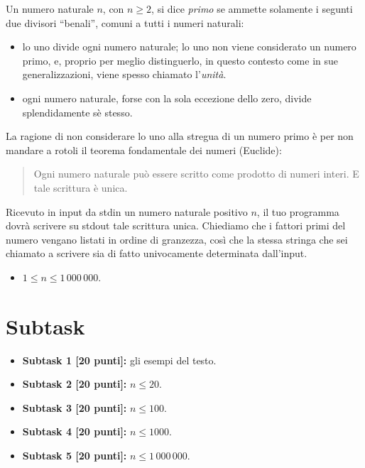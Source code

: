 \renewcommand{\nomebreve}{factor}
\renewcommand{\titolo}{Produrre la fattorizzazione di un naturale come prodotto di primi}

\introduzione{}

Un numero naturale $n$, con $n\geq 2$, si dice \emph{primo} se ammette solamente i segunti due divisori ``benali'', comuni a tutti i numeri naturali:
\begin{itemize}
\item lo uno divide ogni numero naturale; lo uno non viene considerato un numero primo, e, proprio per meglio distinguerlo, in questo contesto come in sue generalizzazioni, viene spesso chiamato l'\emph{unità}.
\item ogni numero naturale, forse con la sola eccezione dello zero, divide splendidamente sè stesso.  
\end{itemize}

La ragione di non considerare lo uno alla stregua di un numero primo è per non mandare a rotoli il teorema fondamentale dei numeri (Euclide):

\begin{quote}
  Ogni numero naturale può essere scritto come prodotto di numeri interi.
  E tale scrittura è unica.
\end{quote}

Ricevuto in input da stdin un numero naturale positivo $n$,
il tuo programma dovrà scrivere su stdout tale scrittura unica.
Chiediamo che i fattori primi del numero vengano listati in ordine di granzezza, così che la stessa stringa che sei chiamato a scrivere sia di fatto univocamente determinata dall'input.






\begin{itemize}[nolistsep, noitemsep]
  \item $1 \le n \le 1\,000\,000$.
\end{itemize}
  
  \section*{Subtask}
  \begin{itemize}
    \item \textbf{Subtask 1 [20 punti]:} gli esempi del testo.
    \item \textbf{Subtask 2 [20 punti]:} $n\leq 20$.
    \item \textbf{Subtask 3 [20 punti]:} $n\leq 100$.
    \item \textbf{Subtask 4 [20 punti]:} $n\leq 1000$.
    \item \textbf{Subtask 5 [20 punti]:} $n\leq 1\,000\,000$.
  \end{itemize}
  
